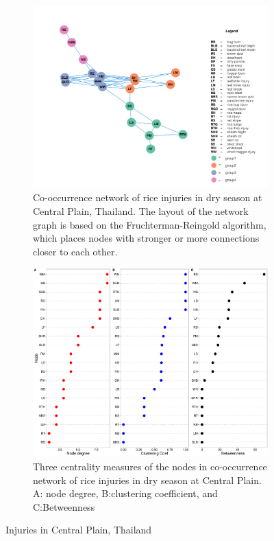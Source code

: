 \begin{figure}
    \centering
    \begin{subfigure}[b]{1\textwidth}
        \includegraphics[width = 1\textwidth]{figures/networkCP_ws.pdf}
        \caption{Co-occurrence network of rice injuries in dry season at Central Plain, Thailand. The layout of the network graph is based on the Fruchterman-Reingold algorithm, which places nodes with stronger or more connections closer to each other.}
        \label{fig:networkCP_ws}
    \end{subfigure}
    \begin{subfigure}[b]{1\textwidth}
        \includegraphics[width = 1\textwidth]{figures/nodepropCP_ws.pdf}
        \caption{Three centrality measures of the nodes in co-occurrence network of rice injuries in dry season at Central Plain. A: node degree, B:clustering coefficient, and C:Betweenness}
        \label{fig:nodepropCP_ds}
    \end{subfigure}
    \caption{Injuries in Central Plain, Thailand}
    \label{fig:CP_ws}
\end{figure}

